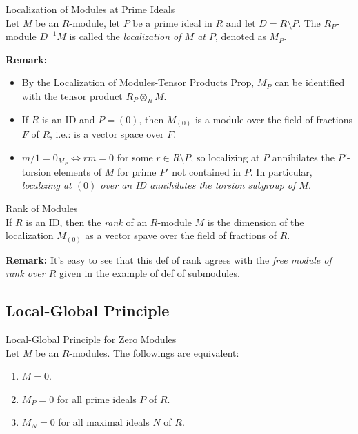 \begin{definition}{Localization of Modules at Prime Ideals}\\
Let $M$ be an $R$-module, let $P$ be a prime ideal in $R$ and let $D=R\setminus P$. The $R_P$-module $D^{-1}M$ is called the \textit{localization of $M$ at $P$}, denoted as $M_P$.
\end{definition}

\noindent\textbf{Remark:} \begin{itemize}
    \item By the Localization of Modules-Tensor Products Prop, $M_P$ can be identified with the tensor product $R_P \otimes _RM$.

    \item If $R$ is an ID and $P=(0)$, then $M_{(0)}$ is a module over the field of fractions $F$ of $R$, i.e.: is a vector space over $F$.

    \item $m/1=0_{M_P} \Leftrightarrow rm=0$ for some $r\in R\setminus P$, so localizing at $P$ annihilates the $P'$-torsion elements of $M$ for prime $P'$ not contained in $P$. In particular, \textit{localizing at $(0)$ over an ID annihilates the torsion subgroup of $M$}.
\end{itemize}

\begin{definition}{Rank of Modules}\\
If $R$ is an ID, then the \textit{rank} of an $R$-module $M$ is the dimension of the localization $M_{(0)}$ as a vector spave over the field of fractions of $R$.
\end{definition}

\noindent\textbf{Remark:} It's easy to see that this def of rank agrees with the \textit{free module of rank over $R$} given in the example of def of submodules.

\subsection{Local-Global Principle}

\begin{proposition}{Local-Global Principle for Zero Modules}\\
Let $M$ be an $R$-modules. The followings are equivalent:
\begin{enumerate}
    \item $M=0$.
    \item $M_P=0$ for all prime ideals $P$ of $R$.
    \item $M_N=0$ for all maximal ideals $N$ of $R$.
\end{enumerate}
\end{proposition}

